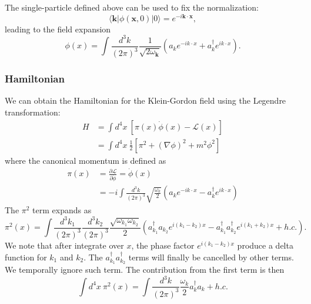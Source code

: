 The single-particle defined above can be used to fix the normalization:
\begin{equation}
	\langle \bm k|\phi(\bm x,0)|0\rangle = e^{-i \bm k\cdot \bm x},
\end{equation}
leading to the field expansion
\begin{equation}
	\phi(x)
	=\int \frac{d^{3} k}{(2\pi)^{3}} \frac{1}{\sqrt{2\omega_{\bm k}}}\left(a_k 
		e^{-i k \cdot x}+a_k^{\dagger} e^{i k \cdot x}\right).
\end{equation}

\subsubsection{Hamiltonian}

We can obtain the Hamiltonian for the Klein-Gordon field using the Legendre transformation:
\begin{equation}
\begin{aligned}
	H &= \int d^4 x\ \left[\pi(x) \dot{\phi}(x) - \mathcal L(x) \right] \\
	&= \int d^4 x\ \frac{1}{2} \left[\pi^2 + (\nabla \phi)^2 + m^2 \phi^2 \right]
\end{aligned}
\end{equation}
where the canonical momentum is defined as
\begin{equation}
\begin{aligned}
	\pi(x) &= \frac{\partial \mathcal L}{\partial \dot{\phi}} = \dot{\phi}(x) \\
	&= -i\int \frac{d^{3} k}{(2\pi)^{3}} \sqrt{\frac{\omega_{k}}{2}}\left(a_k 
		e^{-i k \cdot x} - a_k^{\dagger} e^{i k \cdot x}\right)
\end{aligned}
\end{equation}
The $\pi^2$ term expands as
\begin{equation}
	\pi^2(x) = \int \frac{d^{3} k_1}{(2\pi)^{3}} \frac{d^{3} k_2}{(2\pi)^{3}}
		\frac{\sqrt{\omega_{k_1} \omega_{k_2}}}{2} \left(a^\dagger_{k_1}a_{k_2}e^{i(k_1-k_2)x} - a^\dagger_{k_1} a^\dagger_{k_2} e^{i(k_1+k_2)x} + h.c.\right).
\end{equation}
We note that after integrate over $x$, the phase factor $e^{i(k_1-k_2)x}$ produce a delta function for $k_1$ and $k_2$.
The $a^\dagger_{k_1} a^\dagger_{k_2}$ terms will finally be cancelled by other terms.
We temporally ignore such term.
The contribution from the first term is then
\begin{equation}
	\int d^4 x\ \pi^2(x) = \int \frac{d^3 k}{(2\pi)^3} \frac{\omega_k}{2} a_k^\dagger a_k + h.c.
\end{equation}
